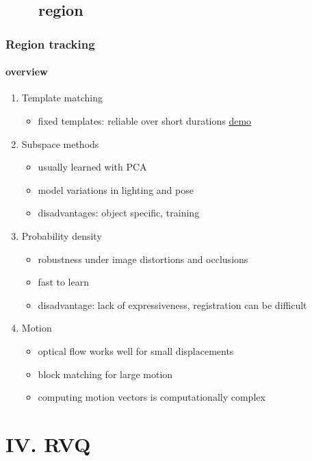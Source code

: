 \subsection{\ \ \ \ region}
\begin{frame}
\frametitle{Region tracking}
\framesubtitle{overview}
\logoCSIPCPL\mypagenum
	\begin{enumerate}
		\item Template matching
			\begin{itemize}
				\item fixed templates: reliable over short durations \href{run:distribute/run_TRK_templateMatching.bat}{{\color{blue}\underline {demo}}}
			\end{itemize}
		\item Subspace methods
			\begin{itemize}
				\item usually learned with PCA
				\item model variations in lighting and pose
				\item disadvantages: object specific, training
			\end{itemize}			
		\item Probability density
			\begin{itemize}
				\item robustness under image distortions and occlusions
				\item fast to learn
				\item disadvantage: lack of expressiveness, registration can be difficult
			\end{itemize}
		\item Motion
			\begin{itemize}
				\item optical flow works well for small displacements
				\item block matching for large motion
				\item computing motion vectors is computationally complex
			\end{itemize}
	\end{enumerate}
\end{frame}


\section{IV. RVQ}
